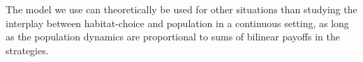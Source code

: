 The model we use can theoretically be used for other situations than studying the interplay between habitat-choice and population in a continuous setting, as long as the population dynamics are proportional to sums of bilinear payoffs in the strategies. 
%












